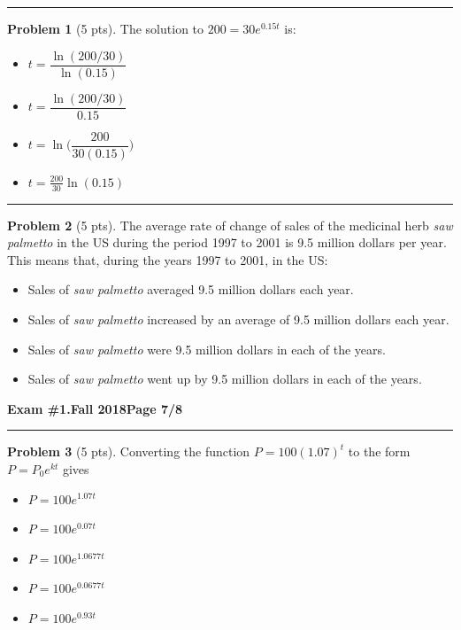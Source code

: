 \documentclass[12pt]{article}
\makeatletter
\theoremstyle{definition}
\newtheorem{problem}{Problem}
\newcommand*{\radiobutton}{%
  \@ifstar{\@radiobutton0}{\@radiobutton1}%
}
\newcommand*{\@radiobutton}[1]{%
  \begin{tikzpicture}
    \pgfmathsetlengthmacro\radius{height("X")/2}
    \draw[radius=\radius] circle;
    \ifcase#1 \fill[radius=.6*\radius] circle;\fi
  \end{tikzpicture}%
}
\makeatother
\begin{document}
\vspace{2cm}
\hrule

\begin{problem}[5 pts]
  The solution to $200 = 30e^{0.15t}$ is:
  \begin{itemize}
  \item[\radiobutton] $t = \dfrac{\ln(200/30)}{\ln(0.15)}$
  \item[\radiobutton] $t = \dfrac{\ln(200/30)}{0.15}$
  \item[\radiobutton] $t = \ln \bigg(\dfrac{200}{30 (0.15)} \bigg)$
  \item[\radiobutton] $t = \frac{200}{30}\ln(0.15)$
  \end{itemize}
\end{problem}
\hrule

\begin{problem}[5 pts]
  The average rate of change of sales of the medicinal herb \textit{saw palmetto} in the US during the period 1997 to 2001
  is 9.5 million dollars per year. This means that, during the years 1997 to 2001, in the US: 
  \begin{itemize}
  \item[\radiobutton] Sales of \textit{saw palmetto} averaged 9.5 million dollars each year.
  \item[\radiobutton] Sales of \textit{saw palmetto} increased by an average of 9.5 million dollars each year.
  \item[\radiobutton] Sales of \textit{saw palmetto} were 9.5 million dollars in each of the years.
  \item[\radiobutton] Sales of \textit{saw palmetto} went up by 9.5 million dollars in each of the years.
  \end{itemize}
\end{problem}

\newpage 


\hfill{\large\bf Exam \#1.}\hfill{\large\bf  Fall 2018}\hfill{\large\bf Page 7/8}\hrule

\bigskip
\begin{problem}[5 pts]
  Converting the function $P = 100 (1.07)^t$ to the form $P = P_0e^{kt}$ gives
  \begin{itemize}
  \item[\radiobutton] $P = 100e^{1.07t}$
  \item[\radiobutton] $P = 100 e^{0.07t}$
  \item[\radiobutton] $P = 100 e^{1.0677t}$
  \item[\radiobutton] $P = 100 e^{0.0677t}$
  \item[\radiobutton] $P = 100 e^{0.93t}$
  \end{itemize}
\end{problem}
\end{document}
